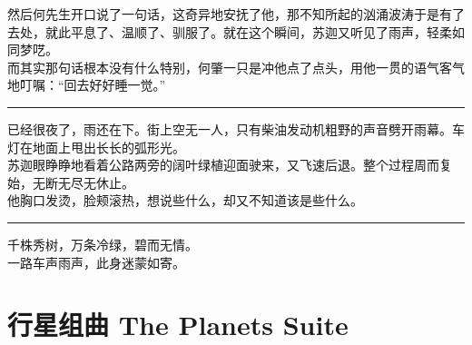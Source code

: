 \documentclass[oneside,11pt]{memoir} %
\begin{document}
\begin{CJK}{UTF8}{gbsn}
    然后何先生开口说了一句话，这奇异地安抚了他，那不知所起的汹涌波涛于是有了去处，就此平息了、温顺了、驯服了。就在这个瞬间，苏迦又听见了雨声，轻柔如同梦呓。\\\indent
    而其实那句话根本没有什么特别，何肇一只是冲他点了点头，用他一贯的语气客气地叮嘱：“回去好好睡一觉。”\\\indent
  \rule{-3pt}{30pt}
    已经很夜了，雨还在下。街上空无一人，只有柴油发动机粗野的声音劈开雨幕。车灯在地面上甩出长长的弧形光。\\\indent
    苏迦眼睁睁地看着公路两旁的阔叶绿植迎面驶来，又飞速后退。整个过程周而复始，无断无尽无休止。\\\indent
    他胸口发烫，脸颊滚热，想说些什么，却又不知道该是些什么。\\\indent
 \rule{-3pt}{30pt}
    千株秀树，万条冷绿，碧而无情。\\\indent
    一路车声雨声，此身迷蒙如寄。\\\indent
\newpage
\chapter{行星组曲      The Planets Suite}
\newpage

\end{CJK}
\end{document}
